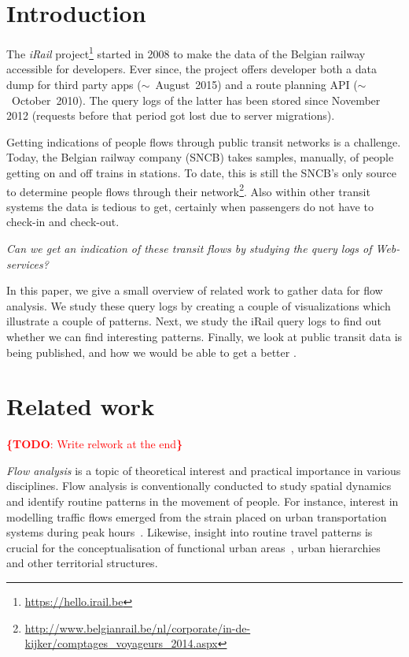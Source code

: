 \documentclass{sig-alternate}
\newcommand{\todo}[1]{\noindent\textcolor{red}{{\bf \{TODO}: #1{\bf \}}}}
\begin{document}
\vspace{1em}

\section{Introduction}
\label{sec:introduction}


The \emph{iRail} project\footnote{\url{https://hello.irail.be}} started in 2008 to make the data of the Belgian railway accessible for developers.
Ever since, the project offers developer both a data dump for third party apps ($\sim$~August~2015) and a route planning API ($\sim$~October~2010).
The query logs of the latter has been stored since November 2012 (requests before that period got lost due to server migrations).

Getting indications of people flows through public transit networks is a challenge.
Today, the Belgian railway company (SNCB) takes samples, manually, of people getting on and off trains in stations. 
To date, this is still the SNCB's only source to determine people flows through their network\footnote{\url{http://www.belgianrail.be/nl/corporate/in-de-kijker/comptages_voyageurs_2014.aspx}}.
Also within other transit systems the data is tedious to get, certainly when passengers do not have to check-in and check-out.

\emph{Can we get an indication of these transit flows by studying the query logs of Web-services?}

In this paper, we give a small overview of related work to gather data for flow analysis.
We study these query logs by creating a couple of visualizations which illustrate a couple of patterns.
Next, we study the iRail query logs to find out whether we can find interesting patterns.
Finally, we look at public transit data is being published, and how we would be able to get a better .

\section{Related work}
\label{sec:relwork}

\todo{Write relwork at the end}

\emph{Flow analysis} is a topic of theoretical interest and practical importance in various disciplines. 
Flow analysis is conventionally conducted to study spatial dynamics and identify routine patterns in the movement of people.
For instance, interest in modelling traffic flows emerged from the strain placed on urban transportation systems during peak hours~\cite{roth,ferreira}.
Likewise, insight into routine travel patterns is crucial for the conceptualisation of functional urban areas~\cite{servillo,sykora}, urban hierarchies~\cite{christaller} and other territorial structures.
\end{document}

